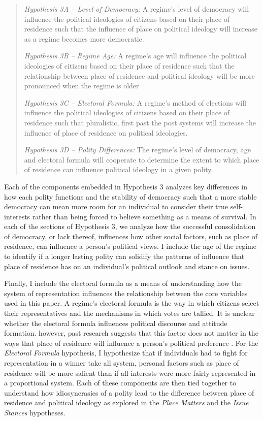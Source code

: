 \documentclass[12pt, titlepage]{article}
\newcommand\e{\emph}
\begin{document}
\begin{quote}
	\e{Hypothesis 3A -- Level of Democracy:} A regime's level of democracy will influence the political ideologies of citizens based on their place of residence such that the influence of place on political ideology will increase as a regime becomes more democratic. 
	
	\e{Hypothesis 3B -- Regime Age:} A regime's age will influence the political ideologies of citizens based on their place of residence such that the relationship between place of residence and political ideology will be more pronounced when the regime is older
	
	\e{Hypothesis 3C -- Electoral Formula:} A regime's method of elections will influence the political ideologies of citizens based on their place of residence such that pluralistic, first past the post systems will increase the influence of place of residence on political ideologies.
	
	\e{Hypothesis 3D -- Polity Differences:} The regime's level of democracy, age and electoral formula will cooperate to determine the extent to which place of residence can influence political ideology in a given polity.
\end{quote}

Each of the components embedded in Hypothesis 3 analyzes key differences in how each polity functions and the stability of democracy such that a more stable democracy can mean more room for an individual to consider their true self-interests rather than being forced to believe something as a means of survival. In each of the sections of Hypothesis 3, we analyze how the successful consolidation of democracy, or lack thereof, influences how other social factors, such as place of residence, can influence a person's political views. I include the age of the regime to identify if a longer lasting polity can solidify the patterns of influence that place of residence has on an individual's political outlook and stance on issues. 

Finally, I include the electoral formula as a means of understanding how the system of representation influences the relationship between the core variables used in this paper. A regime's electoral formula is the way in which citizens select their representatives and the mechanisms in which votes are tallied. It is unclear whether the electoral formula influences political discourse and attitude formation. however, past research suggests that this factor does not matter in the ways that place of residence will influence a person's political preference \cite{barkan_space_2006}. For the \e{Electoral Formula} hypothesis, I hypothesize that if individuals had to fight for representation in a winner take all system, personal factors such as place of residence will be more salient than if all interests were more fairly represented in a proportional system. Each of these components are then tied together to understand how idiosyncrasies of a polity lead to the difference between place of residence and political ideology as explored in the \e{Place Matters} and the \e{Issue Stances} hypotheses.
\end{document}

